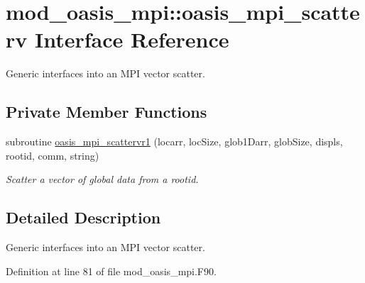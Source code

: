 \hypertarget{interfacemod__oasis__mpi_1_1oasis__mpi__scatterv}{\section{mod\+\_\+oasis\+\_\+mpi\+:\+:oasis\+\_\+mpi\+\_\+scatterv Interface Reference}
\label{interfacemod__oasis__mpi_1_1oasis__mpi__scatterv}
}


Generic interfaces into an M\+P\+I vector scatter.  


\subsection*{Private Member Functions}
\begin{DoxyCompactItemize}
\item 
subroutine \hyperlink{interfacemod__oasis__mpi_1_1oasis__mpi__scatterv_a3fcba01cf7b4de3c6c05fa8999f5c00d}{oasis\+\_\+mpi\+\_\+scattervr1} (locarr, loc\+Size, glob1\+Darr, glob\+Size, displs, rootid, comm, string)
\begin{DoxyCompactList}\small\item\em Scatter a vector of global data from a rootid. \end{DoxyCompactList}\end{DoxyCompactItemize}


\subsection{Detailed Description}
Generic interfaces into an M\+P\+I vector scatter. 

Definition at line 81 of file mod\+\_\+oasis\+\_\+mpi.\+F90.



